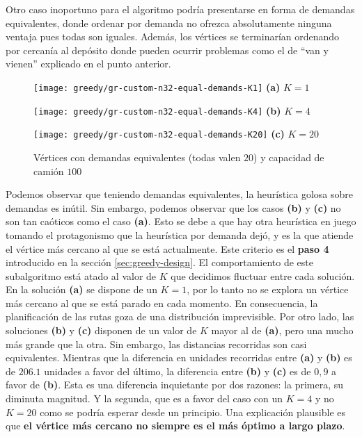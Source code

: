 Otro caso inoportuno para el algoritmo podría presentarse en forma de demandas equivalentes, donde ordenar por demanda no ofrezca absolutamente ninguna ventaja pues todas son iguales. Además, los vértices se terminarían ordenando por cercanía al depósito donde pueden ocurrir problemas como el de ``van y vienen'' explicado en el punto anterior.

\begin{figure}[H]
	\centering
  \label{fig:sgr-custom-n32-equal-demands}
  \caption{\footnotesize Vértices con demandas equivalentes (todas valen $20$) y capacidad de camión $100$}
	\begin{minipage}{0.30\textwidth}
		\centering
		\texttt{[image: greedy/gr-custom-n32-equal-demands-K1]}
		\footnotesize \textbf{(a)} $K = 1$
	\end{minipage}%
  \hspace{0.03\textwidth}
	\begin{minipage}{0.30\textwidth}
		\centering
		\texttt{[image: greedy/gr-custom-n32-equal-demands-K4]}
    \footnotesize \textbf{(b)} $K = 4$
	\end{minipage}%
  \hspace{0.03\textwidth}
	\begin{minipage}{0.30\textwidth}
		\centering
		\texttt{[image: greedy/gr-custom-n32-equal-demands-K20]}
    \footnotesize \textbf{(c)} $K = 20$
	\end{minipage}%
\end{figure}

Podemos observar que teniendo demandas equivalentes, la heurística golosa sobre demandas es inútil. Sin embargo, podemos observar que los casos \textbf{(b)} y \textbf{(c)} no son tan caóticos como el caso \textbf{(a)}. Esto se debe a que hay otra heurística en juego tomando el protagonismo que la heurística por demanda dejó, y es la que atiende el vértice más cercano al que se está actualmente. Este criterio es el \textbf{paso 4} introducido en la sección \ref{sec:greedy-design}. El comportamiento de este subalgoritmo está atado al valor de $K$ que decidimos fluctuar entre cada solución. En la solución \textbf{(a)} se dispone de un $K=1$, por lo tanto no se explora un vértice más cercano al que se está parado en cada momento. En consecuencia, la planificación de las rutas goza de una distribución imprevisible. Por otro lado, las soluciones \textbf{(b)} y \textbf{(c)} disponen de un valor de $K$ mayor al de \textbf{(a)}, pero una mucho más grande que la otra. Sin embargo, las distancias recorridas son casi equivalentes. Mientras que la diferencia en unidades recorridas entre \textbf{(a)} y \textbf{(b)} es de $206.1$ unidades a favor del último, la diferencia entre \textbf{(b)} y \textbf{(c)} es de $0,9$ a favor de \textbf{(b)}. Esta es una diferencia inquietante por dos razones: la primera, su diminuta magnitud. Y la segunda, que es a favor del caso con un $K=4$ y no $K=20$ como se podría esperar desde un principio. Una explicación plausible es que \textbf{el vértice más cercano no siempre es el más óptimo a largo plazo}.

